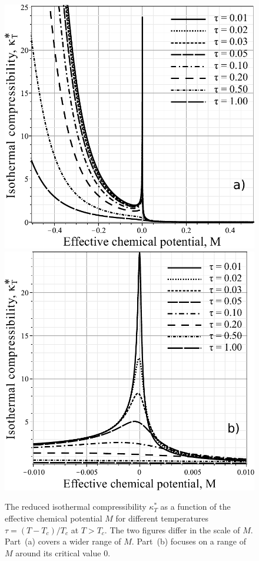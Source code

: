 \documentclass[fleqn,twoside,twocolumn,nofootinbib,showkeys]{revtex4} %
\begin{document}
	\begin{figure}[h!] 
		\includegraphics[width=\column]{f2b.pdf}
		\includegraphics[width=\column]{f2c.pdf}
		\vskip-3mm
		\caption{The reduced isothermal compressibility $\kappa^*_T$ as a function of the effective chemical potential $M$ for different temperatures $\tau = (T - T_c)/T_c$ at $T > T_c$. The two figures differ in the scale of $M$. Part~(a) covers a wider range of $M$. Part~(b) focuses on a range of $M$ around its critical value $0$.
		}
		\label{fig2b}
	\end{figure}
	
\end{document}
